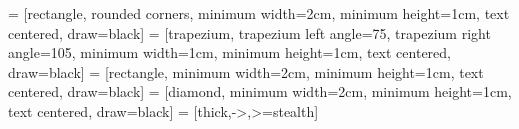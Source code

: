 \newcommand*\listfigureandtablename{索引}


\renewcommand{\labelitemi}{\ensuremath{\bullet}}

\graphicspath{{fig/}{figure/}{figures/}{logo/}{logos/}{graph/}{graphs}}

\captiondelim{\ }
\captionnamefont{\songti\small}
\captiontitlefont{\songti\small}

\renewcommand{\textfraction}{0.15}
\renewcommand{\topfraction}{0.85}
\renewcommand{\bottomfraction}{0.65}
\renewcommand{\floatpagefraction}{0.60}

\renewcommand{\theequation}{\arabic{chapter}--\arabic{equation}}
\renewcommand{\thefigure}{\arabic{chapter}--\arabic{figure}}
\renewcommand\p@subfigure{\thefigure}
\renewcommand{\thetable}{\arabic{chapter}--\arabic{table}}
\renewcommand{\thealgorithm}{\arabic{chapter}--\arabic{algorithm}}


 = [rectangle, rounded corners, minimum width=2cm, minimum height=1cm, text centered, draw=black]
 = [trapezium, trapezium left angle=75, trapezium right angle=105, minimum width=1cm, minimum height=1cm, text centered, draw=black]
 = [rectangle, minimum width=2cm, minimum height=1cm, text centered, draw=black]
 = [diamond, minimum width=2cm, minimum height=1cm, text centered, draw=black]
 = [thick,->,>=stealth]

